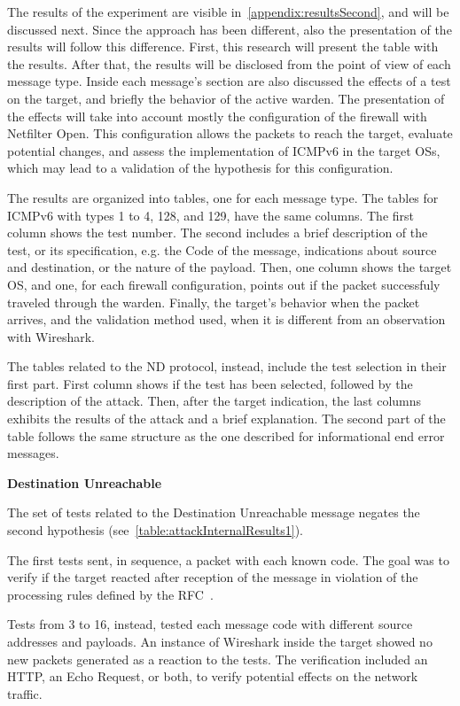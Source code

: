 \documentclass[12pt]{article}
\begin{document}
The results of the experiment are visible in~\cref{appendix:resultsSecond}, and will be discussed next. Since the approach has been different, also the presentation of the results will follow this difference. First, this research will present the table with the results. After that, the results will be disclosed from the point of view of each message type. Inside each message's section are also discussed the effects of a test on the target, and briefly the behavior of the active warden. The presentation of the effects will take into account mostly the configuration of the firewall with Netfilter Open. This configuration allows the packets to reach the target, evaluate potential changes, and assess the implementation of ICMPv6 in the target OSs, which may lead to a validation of the hypothesis for this configuration.

The results are organized into tables, one for each message type. The tables for ICMPv6 with types 1 to 4, 128, and 129, have the same columns. The first column shows the test number. The second includes a brief description of the test, or its specification, e.g. the Code of the message, indications about source and destination, or the nature of the payload. Then, one column shows the target OS, and one, for each firewall configuration, points out if the packet successfuly traveled through the warden. Finally, the target's behavior when the packet arrives, and the validation method used, when it is different from an observation with Wireshark.

The tables related to the ND protocol, instead, include the test selection in their first part. First column shows if the test has been selected, followed by the description of the attack. Then, after the target indication, the last columns exhibits the results of the attack and a brief explanation. The second part of the table follows the same structure as the one described for informational end error messages.


\textbf{Destination Unreachable}

The set of tests related to the Destination Unreachable message negates the second hypothesis (see~\cref{table:attackInternalResults1}).

The first tests sent, in sequence, a packet with each known code. The goal was to verify if the target reacted after reception of the message in violation of the processing rules defined by the RFC~\cite{rfc4443}.

Tests from 3 to 16, instead, tested each message code with different source addresses and payloads. An instance of Wireshark inside the target showed no new packets generated as a reaction to the tests. The verification included an HTTP, an Echo Request, or both, to verify potential effects on the network traffic.
\end{document}
